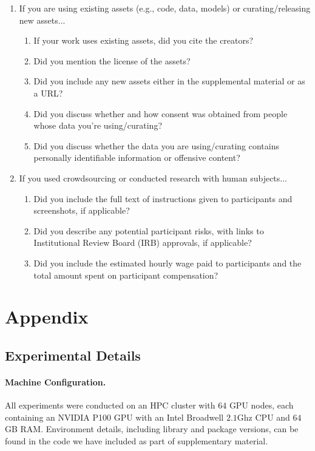 \documentclass{article}
\begin{document}
\begin{enumerate}
\item If you are using existing assets (e.g., code, data, models) or curating/releasing new assets...
\begin{enumerate}
  \item If your work uses existing assets, did you cite the creators?
  \item Did you mention the license of the assets?
  \item Did you include any new assets either in the supplemental material or as a URL?
    \answerNA{}
  \item Did you discuss whether and how consent was obtained from people whose data you're using/curating?
  \item Did you discuss whether the data you are using/curating contains personally identifiable information or offensive content?
\end{enumerate}

\item If you used crowdsourcing or conducted research with human subjects...
\begin{enumerate}
  \item Did you include the full text of instructions given to participants and screenshots, if applicable?
    \answerNA{}
  \item Did you describe any potential participant risks, with links to Institutional Review Board (IRB) approvals, if applicable?
    \answerNA{}
  \item Did you include the estimated hourly wage paid to participants and the total amount spent on participant compensation?
    \answerNA{}
\end{enumerate}

\end{enumerate}
\fi
\newpage
\appendix
\section{Appendix}
\subsection{Experimental Details}
\label{sec:implementationdetails}

\paragraph{Machine Configuration. } 
All experiments were conducted on an HPC cluster with $64$ GPU nodes, each containing an NVIDIA P100 GPU with an Intel Broadwell $2.1$Ghz CPU and $64$ GB RAM.
Environment details, including library and package versions, can be found in the code we have included as part of supplementary material.
\end{document}
